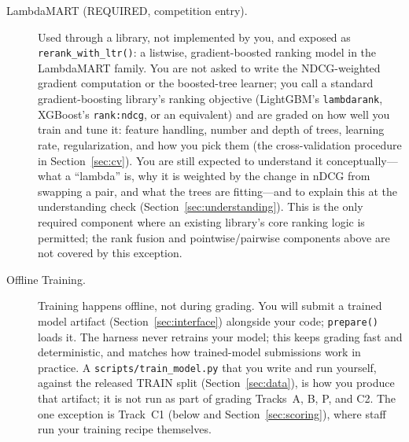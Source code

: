 \documentclass[10pt]{article}
\begin{document}
\begin{description}
  \item[LambdaMART (REQUIRED, competition entry).]
  Used through a library, not implemented by you, and exposed as \texttt{rerank\_with\_ltr()}: a listwise, gradient-boosted ranking model in the LambdaMART family. You are not asked to write the NDCG-weighted gradient computation or the boosted-tree learner; you call a standard gradient-boosting library's ranking objective (LightGBM's \texttt{lambdarank}, XGBoost's \texttt{rank:ndcg}, or an equivalent) and are graded on how well you train and tune it: feature handling, number and depth of trees, learning rate, regularization, and how you pick them (the cross-validation procedure in Section~\ref{sec:cv}). You are still expected to understand it conceptually---what a ``lambda'' is, why it is weighted by the change in nDCG from swapping a pair, and what the trees are fitting---and to explain this at the understanding check (Section~\ref{sec:understanding}). This is the only required component where an existing library's core ranking logic is permitted; the rank fusion and pointwise/pairwise components above are not covered by this exception.

  \item[Offline Training.]
  Training happens offline, not during grading. You will submit a trained model artifact (Section~\ref{sec:interface}) alongside your code; \texttt{prepare()} loads it. The harness never retrains your model; this keeps grading fast and deterministic, and matches how trained-model submissions work in practice. A \texttt{scripts/train\_model.py} that you write and run yourself, against the released TRAIN split (Section~\ref{sec:data}), is how you produce that artifact; it is not run as part of grading Tracks~A, B, P, and C2. The one exception is Track~C1 (below and Section~\ref{sec:scoring}), where staff run your training recipe themselves.


\end{description}
\end{document}
